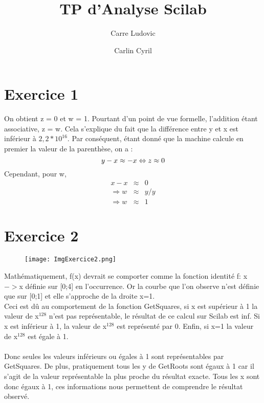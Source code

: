 \documentclass{article}
\title{TP d'Analyse Scilab}
\author{
    Carre Ludovic
    \and
    Carlin Cyril
}
\begin{document}
\maketitle

\section{Exercice 1}
On obtient z = 0 et w = 1. Pourtant d'un point de vue formelle, l'addition étant associative, z = w.
Cela s'explique du fait que la différence entre y et x est inférieur à $2,2*10^{16}$.
Par conséquent, étant donné que la machine calcule en premier la valeur de la parenthèse, on a :  
\begin{displaymath}
    y - x \approx -x \\
    \Leftrightarrow
    z \approx 0
\end{displaymath}
Cependant, pour w,
\begin{eqnarray*}
    x - x &\approx& 0\\
    \Rightarrow
    w &\approx& y / y\\
    \Rightarrow
    w &\approx& 1
\end{eqnarray*}

\section{Exercice 2}
\begin{figure}[h]
\noindent \texttt{[image: ImgExercice2.png]}
\end{figure}
Mathématiquement, f(x) devrait se comporter comme la fonction identité f: x${->}$x définie sur [0;4] en l'occurrence. Or la courbe que l'on observe n'est définie que sur [0;1] et elle s'approche de la droite x=1.\\Ceci est dû au comportement de la fonction GetSquares, si x est supérieur à 1 la valeur de x$^{128}$ n'est pas représentable, le résultat de ce calcul sur Scilab est inf. Si x est inférieur à 1, la valeur de x$^{128}$ est représenté par 0. Enfin, si x=1 la valeur de x$^{128}$ est égale à 1.\\\\
Donc seules les valeurs inférieurs ou égales à 1 sont représentables par GetSquares. De plus, pratiquement tous les y de GetRoots sont égaux à 1 car il s'agit de la valeur représentable la plus proche du résultat exacte. Tous les x sont donc égaux à 1, ces informations nous permettent de comprendre le résultat observé.
\end{document}
